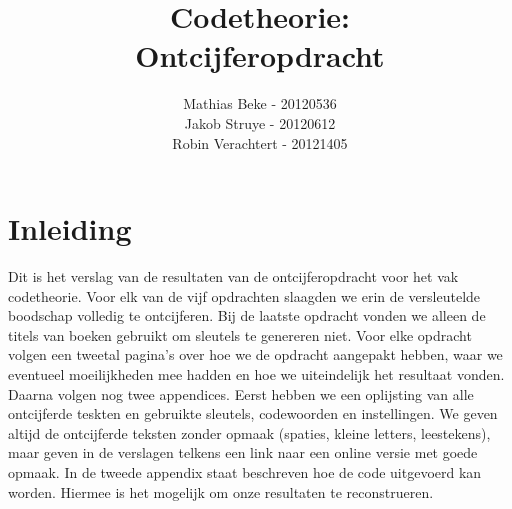 \documentclass[a4paper,11pt]{article}
\author{Mathias Beke - 20120536\\ Jakob Struye - 20120612 \\ Robin Verachtert - 20121405}
\title{Codetheorie: \\Ontcijferopdracht}
\begin{document}
\maketitle
\tableofcontents
\pagebreak

\section{Inleiding}
Dit is het verslag van de resultaten van de ontcijferopdracht voor het vak codetheorie. Voor elk van de vijf opdrachten slaagden we erin de versleutelde boodschap volledig te ontcijferen. Bij de laatste opdracht vonden we alleen de titels van boeken gebruikt om sleutels te genereren niet. Voor elke opdracht volgen een tweetal pagina's over hoe we de opdracht aangepakt hebben, waar we eventueel moeilijkheden mee hadden en hoe we uiteindelijk het resultaat vonden. Daarna volgen nog twee appendices. Eerst hebben we een oplijsting van alle ontcijferde teskten en gebruikte sleutels, codewoorden en instellingen. We geven altijd de ontcijferde teksten zonder opmaak (spaties, kleine letters, leestekens), maar geven in de verslagen telkens een link naar een online versie met goede opmaak. In de tweede appendix staat beschreven hoe de code uitgevoerd kan worden. Hiermee is het mogelijk om onze resultaten te reconstrueren.




\pagebreak %


\pagebreak %

\end{document}

